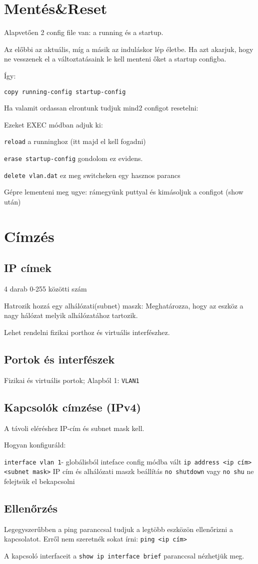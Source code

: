 \section{Mentés\&Reset}
Alapvetően 2 config file van: a running és a startup.

Az előbbi az aktuális, míg a másik az induláskor lép életbe. Ha azt akarjuk, hogy ne vesszenek el a változtatásaink le kell menteni őket a startup configba.

Így:
\begin{parancs}
    \verb|copy running-config startup-config|
\end{parancs}

 Ha valamit ordassan elrontunk tudjuk mind2 configot resetelni:
\begin{parancs}
	Ezeket EXEC módban adjuk ki:

	\verb|reload| a runninghoz (itt majd el kell fogadni)

	\verb|erase startup-config| gondolom ez evidens.

	\verb|delete vlan.dat| ez meg switcheken egy hasznos parancs
\end{parancs}

Gépre lementeni meg ugye: rámegyünk puttyal és kimásoljuk a configot (show után)

\section{Címzés}
\subsection{IP címek}
4 darab 0-255 közötti szám

Hatrozik hozzá egy alhálózati(subnet) maszk: Meghatározza, hogy az eszköz a nagy hálózat melyik alhálózatához tartozik. 

Lehet rendelni fizikai porthoz és virtuális interfészhez.

\subsection{Portok és interfészek}
Fizikai és virtuális portok; Alapból 1: \verb|VLAN1|

\subsection{Kapcsolók címzése (IPv4)}
A távoli eléréshez IP-cím és subnet mask kell.

Hogyan konfiguráld:
\begin{parancs}
	\verb|interface vlan 1|- globálisból inteface config módba vált
	\verb|ip address <ip cím> <subnet mask>| IP cím és alhálózati maszk beállítás
	\verb|no shutdown| vagy \verb|no shu| ne felejtsük el bekapcsolni
\end{parancs}

\subsection{Ellenőrzés}
Legegyszerűbben a ping paranccsal tudjuk a legtöbb eszközön ellenőrizni a kapcsolatot. Erről nem szeretnék sokat írni: \verb|ping <ip cím>|

A kapcsoló interfaceit a \verb|show ip interface brief| paranccsal nézhetjük meg.

